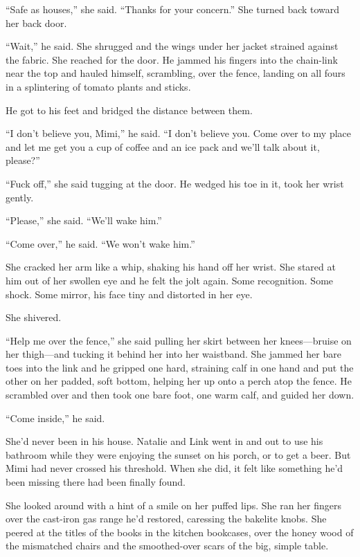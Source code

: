 ``Safe as houses,'' she said.  ``Thanks for your concern.'' She turned
back toward her back door.

``Wait,'' he said.  She shrugged and the wings under her jacket
strained against the fabric.  She reached for the door.  He jammed his
fingers into the chain-link near the top and hauled himself,
scrambling, over the fence, landing on all fours in a splintering of
tomato plants and sticks.

He got to his feet and bridged the distance between them.

``I don't believe you, Mimi,'' he said.  ``I don't believe you.  Come
over to my place and let me get you a cup of coffee and an ice pack
and we'll talk about it, please?''

``Fuck off,'' she said tugging at the door.  He wedged his toe in it,
took her wrist gently.

``Please,'' she said.  ``We'll wake him.''

``Come over,'' he said.  ``We won't wake him.''

She cracked her arm like a whip, shaking his hand off her wrist.  She
stared at him out of her swollen eye and he felt the jolt again.  Some
recognition.  Some shock.  Some mirror, his face tiny and distorted in
her eye.

She shivered.

``Help me over the fence,'' she said pulling her skirt between her
knees---bruise on her thigh---and tucking it behind her into her
waistband.  She jammed her bare toes into the link and he gripped one
hard, straining calf in one hand and put the other on her padded, soft
bottom, helping her up onto a perch atop the fence.  He scrambled over
and then took one bare foot, one warm calf, and guided her down.

``Come inside,'' he said.

She'd never been in his house.  Natalie and Link went in and out to
use his bathroom while they were enjoying the sunset on his porch, or
to get a beer.  But Mimi had never crossed his threshold.  When she
did, it felt like something he'd been missing there had been finally
found.

She looked around with a hint of a smile on her puffed lips.  She ran
her fingers over the cast-iron gas range he'd restored, caressing the
bakelite knobs.  She peered at the titles of the books in the kitchen
bookcases, over the honey wood of the mismatched chairs and the
smoothed-over scars of the big, simple table.

